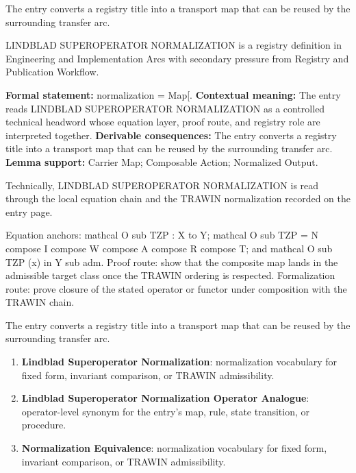 The entry converts a registry title into a transport map that can be reused by the surrounding transfer arc.
\clearpage


\begingroup\small
{}
LINDBLAD SUPEROPERATOR NORMALIZATION is a registry definition in Engineering and Implementation Arcs with secondary pressure from Registry and Publication Workflow.

\begingroup\footnotesize\setlength{\emergencystretch}{3em}\sloppy
\textbf{Formal statement:} normalization = Map[. \textbf{Contextual meaning:} The entry reads LINDBLAD SUPEROPERATOR NORMALIZATION as a controlled technical headword whose equation layer, proof route, and registry role are interpreted together. \textbf{Derivable consequences:} The entry converts a registry title into a transport map that can be reused by the surrounding transfer arc. \textbf{Lemma support:} Carrier Map; Composable Action; Normalized Output.\par
\endgroup

Technically, LINDBLAD SUPEROPERATOR NORMALIZATION is read through the local equation chain and the TRAWIN normalization recorded on the entry page.

Equation anchors: mathcal O sub TZP : X to Y; mathcal O sub TZP = N compose I compose W compose A compose R compose T; and mathcal O sub TZP (x) in Y sub adm. Proof route: show that the composite map lands in the admissible target class once the TRAWIN ordering is respected. Formalization route: prove closure of the stated operator or functor under composition with the TRAWIN chain.

The entry converts a registry title into a transport map that can be reused by the surrounding transfer arc.
\endgroup

\begin{enumerate}[leftmargin=1.6em,itemsep=6pt,topsep=4pt]
\item \textbf{Lindblad Superoperator Normalization}: normalization vocabulary for fixed form, invariant comparison, or TRAWIN admissibility.
\item \textbf{Lindblad Superoperator Normalization Operator Analogue}: operator-level synonym for the entry's map, rule, state transition, or procedure.
\item \textbf{Normalization Equivalence}: normalization vocabulary for fixed form, invariant comparison, or TRAWIN admissibility.
\end{enumerate}

